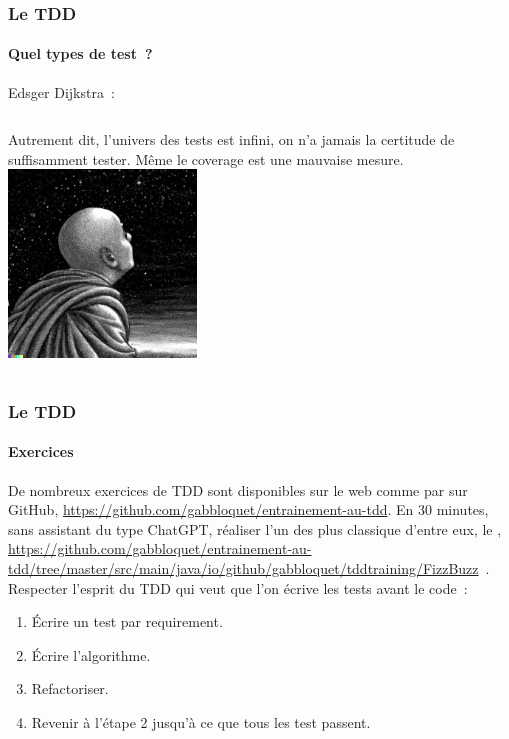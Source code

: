 \documentclass{beamer}
\begin{document}
    \begin{frame}
        \transdissolve
        \frametitle{Le TDD}
        \framesubtitle{Quel types de test~?}
        Edsger Dijkstra~: 
        \bigbreak
        \begin{columns}
            Autrement dit, l'univers des tests est infini, on n'a jamais la certitude de suffisamment tester.
            \bigbreak
            Même le coverage est une mauvaise mesure.
            \centering
            \includegraphics[width=5cm]{image/monk-looking-the-deepness-of-the-stars-in-the-night-sky}
        \end{columns}
    \end{frame}

    \begin{frame}
        \transdissolve
        \frametitle{Le TDD}
        \framesubtitle{Exercices \execcounterdispinc{}}
        De nombreux exercices de TDD sont disponibles sur le web comme par sur GitHub, \url{https://github.com/gabbloquet/entrainement-au-tdd}.
        \bigbreak
        En 30 minutes, sans assistant du type ChatGPT, réaliser l'un des plus classique d'entre eux, le , \url{https://github.com/gabbloquet/entrainement-au-tdd/tree/master/src/main/java/io/github/gabbloquet/tddtraining/FizzBuzz}~.
        Respecter l'esprit du TDD qui veut que l'on écrive les tests avant le code~:
        \begin{enumerate}
            \item Écrire un test par requirement.
            \item Écrire l'algorithme.
            \item Refactoriser.
            \item Revenir à l'étape 2 jusqu'à ce que tous les test passent.
        \end{enumerate}

    \end{frame}
\end{document}
